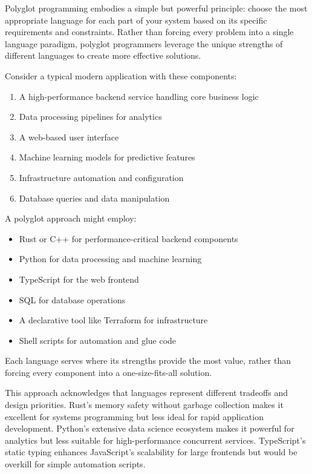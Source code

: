 \documentclass[11pt]{article}
\begin{document}
Polyglot programming embodies a simple but powerful principle: choose the most appropriate language for each part of your system based on its specific requirements and constraints. Rather than forcing every problem into a single language paradigm, polyglot programmers leverage the unique strengths of different languages to create more effective solutions.

Consider a typical modern application with these components:

\begin{enumerate}
\item A high-performance backend service handling core business logic
\item Data processing pipelines for analytics
\item A web-based user interface
\item Machine learning models for predictive features
\item Infrastructure automation and configuration
\item Database queries and data manipulation
\end{enumerate}

A polyglot approach might employ:

\begin{itemize}
\item Rust or C++ for performance-critical backend components
\item Python for data processing and machine learning
\item TypeScript for the web frontend
\item SQL for database operations
\item A declarative tool like Terraform for infrastructure
\item Shell scripts for automation and glue code
\end{itemize}

Each language serves where its strengths provide the most value, rather than forcing every component into a one-size-fits-all solution.

This approach acknowledges that languages represent different tradeoffs and design priorities. Rust's memory safety without garbage collection makes it excellent for systems programming but less ideal for rapid application development. Python's extensive data science ecosystem makes it powerful for analytics but less suitable for high-performance concurrent services. TypeScript's static typing enhances JavaScript's scalability for large frontends but would be overkill for simple automation scripts.
\end{document}
